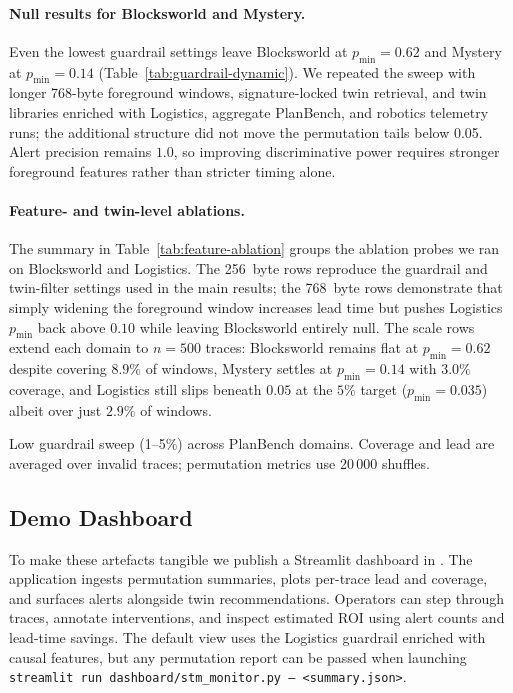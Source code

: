 \documentclass[11pt]{article}
\begin{document}
\paragraph{Null results for Blocksworld and Mystery.} Even the lowest guardrail
settings leave Blocksworld at $p_{\min}=0.62$ and Mystery at
$p_{\min}=0.14$ (Table~\ref{tab:guardrail-dynamic}). We repeated the sweep with
longer 768-byte foreground windows, signature-locked twin retrieval, and twin
libraries enriched with Logistics, aggregate PlanBench, and robotics telemetry
runs; the additional structure did not move the permutation tails below 0.05.
Alert precision remains $1.0$, so improving discriminative power requires
stronger foreground features rather than stricter timing alone.

\paragraph{Feature- and twin-level ablations.} The summary in
Table~\ref{tab:feature-ablation} groups the ablation probes we ran on
Blocksworld and Logistics. The 256~byte rows reproduce the guardrail and
twin-filter settings used in the main results; the 768~byte rows demonstrate
that simply widening the foreground window increases lead time but pushes Logistics
$p_{\min}$ back above $0.10$ while leaving Blocksworld entirely null. The scale
rows extend each domain to $n=500$ traces: Blocksworld remains flat at
$p_{\min}=0.62$ despite covering $8.9\%$ of windows, Mystery settles at
$p_{\min}=0.14$ with $3.0\%$ coverage, and Logistics still slips beneath $0.05$
at the $5\%$ target ($p_{\min}=0.035$) albeit over just $2.9\%$ of windows.

\begin{table}[t]
  \centering
  \caption{Low guardrail sweep (1--5\%) across PlanBench domains. Coverage and lead are averaged over invalid traces; permutation metrics use 20\,000 shuffles.}
  \label{tab:guardrail-dynamic}
  
\end{table}

\subsection{Demo Dashboard}
\label{subsec:demo-dashboard}
To make these artefacts tangible we publish a Streamlit dashboard in
. The application ingests permutation summaries,
plots per-trace lead and coverage, and surfaces alerts alongside twin
recommendations. Operators can step through traces, annotate interventions, and
inspect estimated ROI using alert counts and lead-time savings. The default view
uses the Logistics guardrail enriched with causal features, but any permutation
report can be passed when launching
\mbox{\texttt{streamlit run dashboard/stm\_monitor.py -- <summary.json>}}.
\end{document}
